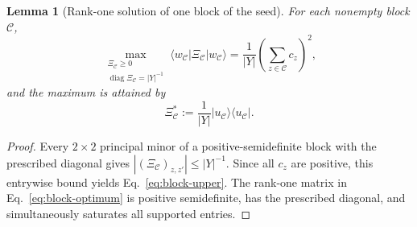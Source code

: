 \documentclass[11pt]{article}
\newcommand{\1}{\mathbf 1}
\newcommand{\ket}[1]{\lvert #1\rangle}
\newcommand{\bra}[1]{\langle #1\rvert}
\theoremstyle{plain}
\newtheorem{lemma}[theorem]{Lemma}
\theoremstyle{definition}
\theoremstyle{remark}
\begin{document}
\begin{lemma}[Rank-one solution of one block of the seed]
\label{lem:blockwise-seed-optimum}
For each nonempty block $\mathcal C$,
\begin{equation}
 \max_{\substack{\Xi_{\mathcal C}\ge0\\
                 \operatorname{diag}\Xi_{\mathcal C}=\lvert Y\rvert^{-1}}}
 \bra{w_{\mathcal C}}\Xi_{\mathcal C}\ket{w_{\mathcal C}}
 =\frac1{\lvert Y\rvert}\left(\sum_{z\in\mathcal C}c_z\right)^2,
 \label{eq:block-upper}
\end{equation}
and the maximum is attained by
\begin{equation}
 \Xi_{\mathcal C}^*
 :=\frac1{\lvert Y\rvert}\ket{u_{\mathcal C}}\!\bra{u_{\mathcal C}}.
 \label{eq:block-optimum}
\end{equation}
\end{lemma}
\begin{proof}
Every $2\times2$ principal minor of a positive-semidefinite block with the
prescribed diagonal gives
$|(\Xi_{\mathcal C})_{z,z'}|\le \lvert Y\rvert^{-1}$.  Since all $c_z$ are positive,
this entrywise bound yields Eq.~\eqref{eq:block-upper}.  The rank-one matrix
in Eq.~\eqref{eq:block-optimum} is positive semidefinite, has the prescribed
diagonal, and simultaneously saturates all supported entries.
\end{proof}
\end{document}
